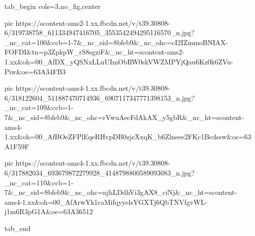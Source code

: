  
 
 
 
 

\ifcmt
  tab_begin cols=3,no_fig,center

     pic https://scontent-ams2-1.xx.fbcdn.net/v/t39.30808-6/319738758_611334947416705_3553542494295116570_n.jpg?_nc_cat=100&ccb=1-7&_nc_sid=8bfeb9&_nc_ohc=cI2IZmmoBNIAX-FOFDI&tn=p3ZpkpW_rS8sgziF&_nc_ht=scontent-ams2-1.xx&oh=00_AfDX_yQSNxLLuUImObRW0skVWZMPYjQau6Kz0k6ZVu-Piw&oe=63A34FB3

     pic https://scontent-ams4-1.xx.fbcdn.net/v/t39.30808-6/318122604_511887470714936_6907117347771398153_n.jpg?_nc_cat=109&ccb=1-7&_nc_sid=8bfeb9&_nc_ohc=rVwuAecFdAkAX_y5gbR&_nc_ht=scontent-ams4-1.xx&oh=00_AfBOeZFPlEqeRHvpDB0zjeXxqK_b6Zlneee2FKc1Bcdssw&oe=63A1F59F

     pic https://scontent-ams4-1.xx.fbcdn.net/v/t39.30808-6/317882034_693679872279928_4148798800589093083_n.jpg?_nc_cat=110&ccb=1-7&_nc_sid=8bfeb9&_nc_ohc=njhLDdhVi3gAX8_ciNj&_nc_ht=scontent-ams4-1.xx&oh=00_AfArwYk1caMifqyyelsYGXTj6QbTNVfgvWL-j1m6R3pG1A&oe=63A36512


  tab_end
\fi
